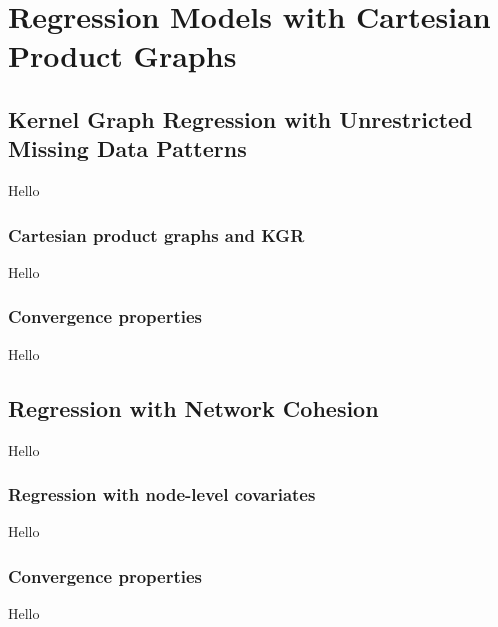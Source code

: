 \chapter{Regression Models with Cartesian Product Graphs}



\section{Kernel Graph Regression with Unrestricted Missing Data Patterns}

\label{sec:kgr_mdp}

Hello

\subsection{Cartesian product graphs and KGR}

Hello

\subsection{Convergence properties}

Hello


\section{Regression with Network Cohesion}

\label{sec:rnc_mdp}

Hello

\subsection{Regression with node-level covariates}

Hello

\subsection{Convergence properties}

Hello